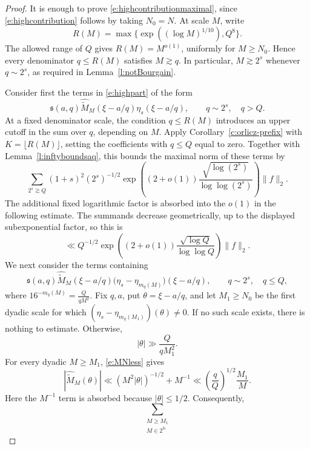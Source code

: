 \documentclass[12pt,reqno]{amsart}
\numberwithin{equation}{section}
\theoremstyle{definition}
\theoremstyle{remark}
\begin{document}
\begin{proof}
It is enough to prove \eqref{e:highcontributionmaximal}, since
\eqref{e:highcontribution} follows by taking \(N_0=N\).  At scale \(M\),
write
\[
 R(M)=\max\{\exp((\log M)^{1/10}),Q^8\}.
\]
The allowed range of \(Q\) gives \(R(M)=M^{o(1)}\), uniformly for
\(M\geq N_0\).  Hence every  denominator \(q\leq R(M)\) satisfies
\(M\gtrsim q\).  In particular, \(M\gtrsim2^s\) whenever \(q\sim2^s\),
as required in Lemma~\ref{l:notBourgain}.

Consider first the terms in \eqref{e:highpart} of the form
\[
 \mathfrak s(a,q)\widehat{\widetilde M}_M(\xi-a/q)
 \eta_s(\xi-a/q),
 \qquad q\sim2^s,\quad q>Q.
\]
At a fixed denominator scale, the condition \(q\leq R(M)\)
introduces an upper cutoff in the sum over \(q\), depending on \(M\).
Apply Corollary~\ref{c:orlicz-prefix} with
\(K=\lfloor R(M)\rfloor\), setting the coefficients with \(q\leq Q\)
equal to zero. Together with Lemma~\ref{l:inftyboundsaq}, this bounds
the maximal norm of these terms by
\[
 \sum_{2^s\gtrsim Q}(1+s)^2(2^s)^{-1/2}
 \exp\left(
 (2+o(1))\frac{\sqrt{\log(2^s)}}{\log\log(2^s)}
 \right)\|f\|_2.
\]
The additional fixed logarithmic factor is absorbed into the
\(o(1)\) in the following estimate.
The summands decrease geometrically, up to the displayed
subexponential factor, so this is
\[
 \ll
 Q^{-1/2}
 \exp\left(
 (2+o(1))\frac{\sqrt{\log Q}}{\log\log Q}
 \right)\|f\|_2.
\]
We next consider the terms containing
\[
 \mathfrak s(a,q)\widehat{\widetilde M}_M(\xi-a/q)
 \bigl(\eta_s-\eta_{m_q(M)}\bigr)(\xi-a/q),
 \qquad q\sim2^s,\quad q\leq Q,
\]
where $16^{-m_q(M)}=\frac{Q}{qM^2}.$
Fix \(q,a\), put \(\theta=\xi-a/q\), and let \(M_1\geq N_0\) be the
first dyadic scale for which
\((\eta_s-\eta_{m_q(M_1)})(\theta)\neq0\).  If no such scale exists,
there is nothing to estimate.  Otherwise,
\[
 |\theta|\gg\frac{Q}{qM_1^2}.
\]
For every dyadic \(M\geq M_1\), \eqref{e:MNless} gives
\[
 |\widehat{\widetilde M}_M(\theta)|
 \ll
 (M^2|\theta|)^{-1/2}+M^{-1}
 \ll
 \left(\frac qQ\right)^{1/2}\frac{M_1}{M}.
\]
Here the \(M^{-1}\) term is absorbed because
\(|\theta|\leq1/2\).  Consequently,
\[
 \sum_{\substack{M\geq M_1\\M\in2^{\mathbb N}}}
\]
\end{proof}
\end{document}
